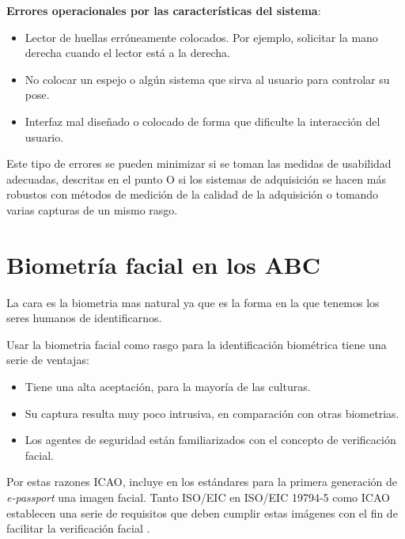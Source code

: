 \textbf{Errores operacionales por las características del sistema}:
\begin{itemize}
    \item 
    Lector de huellas erróneamente colocados. Por ejemplo, solicitar la mano derecha cuando el lector está a la derecha.
    \item
    No colocar un espejo o algún sistema que sirva al usuario para controlar su pose.  
    \item
    Interfaz mal diseñado o colocado de forma que dificulte la interacción del usuario.
\end{itemize}

Este tipo de errores se pueden minimizar si se toman las medidas de usabilidad adecuadas, descritas en el punto 
O si los sistemas de adquisición se hacen más robustos con métodos de medición de la calidad de la adquisición o tomando varias capturas de un mismo rasgo. 


\section{Biometría facial en los ABC}\label{sec:BiometriaFacialABC}

La cara es la \gls{biometria} mas natural ya que es la forma en la que tenemos los seres humanos de identificarnos.

Usar la \gls{biometria} \gls{facial} como rasgo para la identificación biométrica tiene una serie de ventajas:
\begin{itemize}
    \item 
    Tiene una alta aceptación, para la mayoría de las culturas.
    \item
    Su \gls{captura} resulta muy poco intrusiva, en comparación con otras \glspl{biometria}.
    \item
    Los agentes de seguridad están familiarizados con el concepto de verificación \gls{facial}.
\end{itemize}

Por estas razones ICAO, incluye en los estándares para la primera generación de \textit{\gls{e-passport}} una imagen \gls{facial}. Tanto ISO/EIC en ISO/EIC 19794-5 como ICAO \cite{doc20069303} establecen una serie de requisitos que deben cumplir estas imágenes con el fin de facilitar la verificación \gls{facial} \cite{jafri2009survey} \cite{del2015face}.

